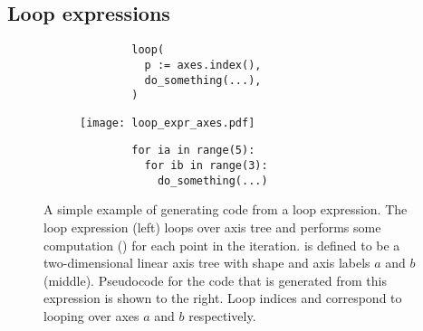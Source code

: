 \documentclass[thesis]{subfiles}
\begin{document}

\subsection{Loop expressions}


\begin{figure}[h]
  \centering

  \hfill
  \begin{subfigure}[t]{.3\textwidth}
    \centering
    \begin{minipage}{.8\textwidth}
      \begin{verbatim}
        loop(
          p := axes.index(),
          do_something(...),
        )
      \end{verbatim}
    \end{minipage}
    \vspace{1em}
  \end{subfigure}
  \hfill
  \begin{subfigure}[t]{.38\textwidth}
    \centering
    \begin{minipage}{\textwidth}
      \centering
      \texttt{[image: loop\_expr\_axes.pdf]}
    \end{minipage}
  \end{subfigure}
  \hfill
  \begin{subfigure}[t]{.3\textwidth}
    \centering
    \begin{minipage}{.8\textwidth}
      \begin{verbatim}
        for ia in range(5):
          for ib in range(3):
            do_something(...)
      \end{verbatim}
    \end{minipage}
    \vspace{1.5em}
  \end{subfigure}
  \hfill

  \caption{
    A simple example of generating code from a loop expression.
    The loop expression (left) loops over axis tree  and performs some computation () for each point in the iteration.
     is defined to be a two-dimensional linear axis tree with shape  and axis labels $a$ and $b$ (middle).
    Pseudocode for the code that is generated from this expression is shown to the right.
    Loop indices  and  correspond to looping over axes $a$ and $b$ respectively.
  }
  \label{fig:loop_expr}
\end{figure}
\end{document}
